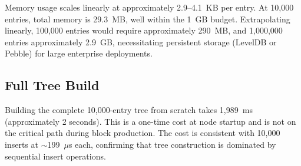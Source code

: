 Memory usage scales linearly at approximately 2.9--4.1~KB per
entry. At 10,000 entries, total memory is 29.3~MB, well within
the 1~GB budget. Extrapolating linearly, 100,000 entries would
require approximately 290~MB, and 1,000,000 entries approximately
2.9~GB, necessitating persistent storage (LevelDB or Pebble) for
large enterprise deployments.

\subsection{Full Tree Build}

Building the complete 10,000-entry tree from scratch takes
1,989~ms (approximately 2 seconds). This is a one-time cost at
node startup and is not on the critical path during block
production. The cost is consistent with 10,000 inserts at
$\sim$199~$\mu$s each, confirming that tree construction is
dominated by sequential insert operations.
